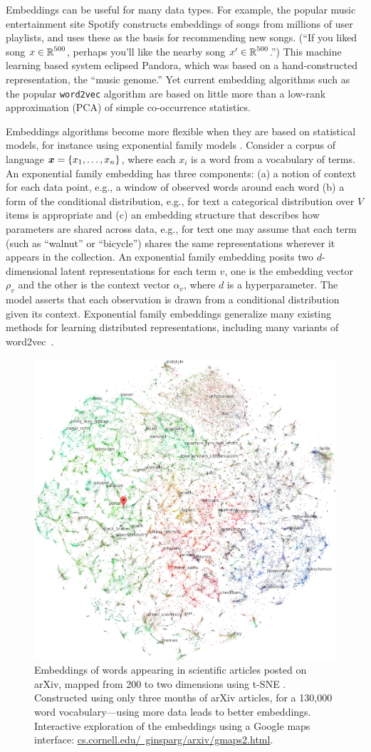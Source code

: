 Embeddings can be useful for many data types. For example, the popular
music entertainment site Spotify constructs embeddings of songs from
millions of user playlists, and uses these as the basis for
recommending new songs.  (``If you liked song $x\in\mbox{$\mathbb{R}$}^{500}$,
perhaps you'll like the nearby song $x'\in\mbox{$\mathbb{R}$}^{500}$.'')  This
machine learning based system eclipsed Pandora, which was based on a
hand-constructed representation, the ``music genome.'' Yet current
embedding algorithms such as the popular \texttt{word2vec} algorithm
are based on little more than a low-rank approximation (PCA) of simple
co-occurrence statistics.

Embeddings algorithms become more flexible when they are based
on statistical models, for instance using exponential family
models \citep{Rudolph:2016b,spherical}.
Consider a corpus of language $\boldsymbol{x} = \{x_1, \ldots, x_n\}$, where
each $x_i$ is a word from a vocabulary of terms. An exponential family
embedding has three components: (a) a notion of context for
each data point, e.g., a window of observed words around each word (b)
a form of the conditional distribution, e.g., for text a
categorical distribution over $V$ items is appropriate and (c) an
embedding structure that describes how parameters are shared
across data, e.g., for text one may assume that each term (such as
``walnut'' or ``bicycle'') shares the same representations wherever it
appears in the collection.
An exponential family embedding
posits two $d$-dimensional latent representations for each term $v$,
one is the embedding vector $\rho_v$ and the other is the
context vector $\alpha_v$, where $d$ is a hyperparameter.  The
model asserts that each observation is drawn from a conditional
distribution given its context. 
Exponential family embeddings generalize many existing methods for
learning distributed representations, including 
many variants of word2vec~\citep{Mikolov:2013}.  


\setlength{\columnsep}{20pt}
\begin{figure}
\centering
\includegraphics[width=.44\textwidth]{figs/ginsparg}
\caption{\small Embeddings of words appearing in scientific articles
posted on arXiv, mapped from 200 to two dimensions using
t-SNE \citep{ginsparg}. Constructed using only three months of
arXiv articles, for a 130,000 word vocabulary---using more data
leads to better embeddings.
Interactive exploration of the embeddings
using a Google maps interface: \href{http://www.cs.cornell.edu/~ginsparg/arxiv/gmaps2.html}{cs.cornell.edu/~ginsparg/arxiv/gmaps2.html}.
}
    \label{fig:arxiv}
    \vskip2pt
\end{figure}

